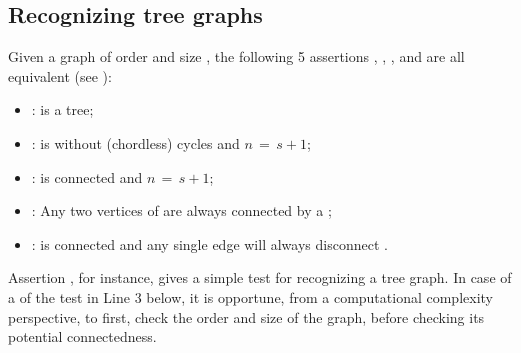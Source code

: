 \documentclass[a4paper,12pt,english]{sphinxhowto}
\begin{document}
\subsection{Recognizing tree graphs}
\label{\detokenize{tutorial:recognizing-tree-graphs}}
Given a graph  of order  and size , the following 5 assertions , , ,  and  are all equivalent (see ):
\begin{itemize}
\item {} 
:  is a tree;

\item {} 
:  is without (chordless) cycles and \(n \,=\, s + 1\);

\item {} 
:  is connected and \(n \,=\, s + 1\);

\item {} 
: Any two vertices of  are always connected by a ;

\item {} 
:  is connected and  any single edge will always disconnect .

\end{itemize}

Assertion , for instance, gives a simple test for recognizing a tree graph. In case of a  of the test in Line 3 below, it is opportune, from a computational complexity perspective, to first, check the order and size of the graph, before checking its potential connectedness.

\begin{sphinxVerbatim}[commandchars=\\\{\},numbers=left,firstnumber=1,stepnumber=1]
   
  
      
\end{sphinxVerbatim}
\end{document}
